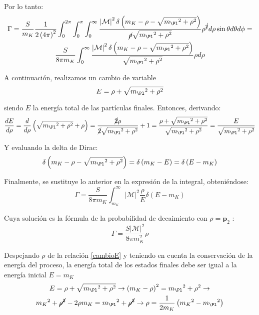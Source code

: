 Por lo tanto:
\begin{multline}
\Gamma =\dfrac{S}{m_{K}}\dfrac{1}{2\left( 4\pi \right) ^{2}}\int ^{2\pi }_{0}\int ^{\pi }_{0}\int ^{\infty }_{0} \dfrac{\left|\mathcal{M}\right| ^{2}\delta\left(m_{K}-\rho-\sqrt{{m_{\Pl}}^{2}+\rho^{2}}\right)}{\cancel{\rho} \sqrt{{m_{\Pl}}^{2}+\rho^{2}}} \rho^{\cancel{2}}d{\rho}\sin \theta d\theta d\phi = \\ \dfrac{S}{8 \pi m_{K}}\int ^{\infty }_{0} \dfrac{\left|\mathcal{M}\right| ^{2}\delta\left(m_{K}-\rho-\sqrt{{m_{\Pl}}^{2}+\rho^{2}}\right)}{\sqrt{{m_{\Pl}}^{2}+\rho^{2}}} \rho d{\rho}
\end{multline}

A continuación, realizamos un cambio de variable 
\begin{equation}
E=\rho+\sqrt{{m_{\Pl}}^{2}+\rho^{2}}\label{cambioE}
\end{equation}

siendo $E$ la energía total de las partículas finales. Entonces, derivando:
\begin{equation}
\dfrac{dE}{d\rho}=\dfrac{d}{d\rho}\left( \sqrt{{m_{\Pl}}^{2}+{\rho}^{2}}+\rho\right) =\dfrac{\cancel{2}\rho}{\cancel{2}\sqrt{{m_{\Pl}}^{2}+\rho^{2}}}+1=\dfrac{\rho + \sqrt{{m_{\Pl}}^{2}+\rho^{2}}}{\sqrt{{m_{\Pl}}^{2}+\rho^{2}}}=\dfrac{E}{\sqrt{{m_{\Pl}}^{2}+\rho^{2}}}
\end{equation}

Y evaluando la delta de Dirac:
\begin{equation}
\delta \left(m_{K}-\rho-\sqrt{{m_{\Pl}}^{2}+\rho^{2}}\right)=\delta\left(m_{K}-E\right)=\delta\left(E-m_{K}\right)
\end{equation}

Finalmente, se sustituye lo anterior en la expresión de la integral, obteniéndose:
\begin{equation}
\Gamma=\dfrac{S}{8 \pi m_{K}}\int ^{\infty }_{m_K}\left| \mathcal{M}\right| ^{2}\dfrac{\rho}{E}\delta \left(E-m_{K}\right)
\end{equation}

Cuya solución es la fórmula de la probabilidad de decaimiento con $\rho=\boldsymbol{p}_2$ :
\begin{equation}
\Gamma =\dfrac{S\left| \mathcal{M}\right| ^{2}}{8\pi m_{K}^{2}}\rho\label{eq:decayratemalo}
\end{equation}

Despejando $\rho$ de la relación \ref{cambioE} y teniendo en cuenta la conservación de la energía del proceso, la energía total de los estados finales debe ser igual a la energía inicial $E=m_K$
\begin{multline}
E=\rho+\sqrt{{m_{\Pl}}^{2}+\rho^{2}} \rightarrow \left(m_{K}-\rho\right)^{2}= {m_{\Pl}}^{2}+\rho^{2} \rightarrow \\ {m_{K}}^{2}+\cancel{\rho^{2}}-2\rho m_{K}={m_{\Pl}}^{2}+\cancel{\rho^{2}} \rightarrow \rho = \dfrac{1}{2 m_K}\left({m_{K}}^{2}-{m_{\Pl}}^{2}\right)
\end{multline}


